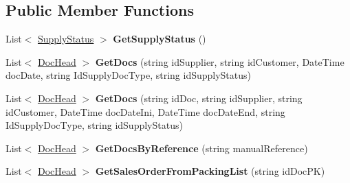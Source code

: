 \subsection*{Public Member Functions}
\begin{DoxyCompactItemize}
\item 
\mbox{\label{interface_h_k_supply_1_1_services_1_1_interfaces_1_1_i_supply_docs_a3b1f4eb5d54d862d209f15783dd5b4c6}} 
List$<$ \mbox{\hyperlink{class_h_k_supply_1_1_models_1_1_supply_1_1_supply_status}{Supply\+Status}} $>$ {\bfseries Get\+Supply\+Status} ()
\item 
\mbox{\label{interface_h_k_supply_1_1_services_1_1_interfaces_1_1_i_supply_docs_a00ab4983c5a2a4afd1d1f27700f870f6}} 
List$<$ \mbox{\hyperlink{class_h_k_supply_1_1_models_1_1_supply_1_1_doc_head}{Doc\+Head}} $>$ {\bfseries Get\+Docs} (string id\+Supplier, string id\+Customer, Date\+Time doc\+Date, string Id\+Supply\+Doc\+Type, string id\+Supply\+Status)
\item 
\mbox{\label{interface_h_k_supply_1_1_services_1_1_interfaces_1_1_i_supply_docs_a1c62306236d38824f24d083953806d9f}} 
List$<$ \mbox{\hyperlink{class_h_k_supply_1_1_models_1_1_supply_1_1_doc_head}{Doc\+Head}} $>$ {\bfseries Get\+Docs} (string id\+Doc, string id\+Supplier, string id\+Customer, Date\+Time doc\+Date\+Ini, Date\+Time doc\+Date\+End, string Id\+Supply\+Doc\+Type, string id\+Supply\+Status)
\item 
\mbox{\label{interface_h_k_supply_1_1_services_1_1_interfaces_1_1_i_supply_docs_a6e51dc052c284e3f2f86e05d1f7203f2}} 
List$<$ \mbox{\hyperlink{class_h_k_supply_1_1_models_1_1_supply_1_1_doc_head}{Doc\+Head}} $>$ {\bfseries Get\+Docs\+By\+Reference} (string manual\+Reference)
\item 
\mbox{\label{interface_h_k_supply_1_1_services_1_1_interfaces_1_1_i_supply_docs_af6b115d3561ed27103c5237ff9857c68}} 
List$<$ \mbox{\hyperlink{class_h_k_supply_1_1_models_1_1_supply_1_1_doc_head}{Doc\+Head}} $>$ {\bfseries Get\+Sales\+Order\+From\+Packing\+List} (string id\+Doc\+PK)

\end{DoxyCompactItemize}
